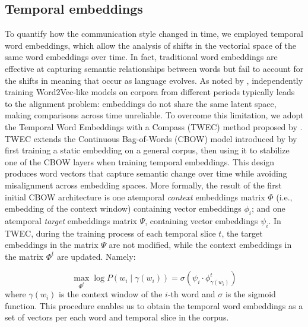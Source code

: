 \subsection{Temporal embeddings}\label{subsec32}
To quantify how the communication style changed in time, we employed temporal word embeddings, which allow the analysis of shifts in the vectorial space of the same word embeddings over time. In fact, traditional word embeddings are effective at capturing semantic relationships between words but fail to account for the shifts in meaning that occur as language evolves. As noted by \cite{Yao2018}, independently training Word2Vec-like models on corpora from different periods typically leads to the alignment problem: embeddings do not share the same latent space, making comparisons across time unreliable. To overcome this limitation, we adopt the Temporal Word Embeddings with a Compass (TWEC) method proposed by \cite{DiCarlo2019}. TWEC extends the Continuous Bag-of-Words (CBOW) model introduced by \cite{Mikolov2013} by first training a static embedding on a general corpus, then using it to stabilize one of the CBOW layers when training temporal embeddings. This design produces word vectors that capture semantic change over time while avoiding misalignment across embedding spaces.
More formally, the result of the first initial CBOW architecture is one atemporal \textit{context} embeddings matrix $\Phi$ (i.e., embedding of the context window) containing vector embeddings $\phi_i$; and one atemporal \textit{target} embeddings matrix $\Psi$, containing vector embeddings $\psi_i$. In TWEC, during the training process of each temporal slice $t$, the target embeddings in the matrix $\Psi$ are not modified, while the context embeddings in the matrix $\Phi^t$ are updated. Namely:

\begin{equation}
    \max_{\Phi^t} \log P(w_i \mid \gamma(w_i)) = \sigma(\psi_i\cdot\phi_{\gamma(w_i)}^t)
\end{equation}
where $\gamma(w_i)$ is the context window of the $i$-th word and $\sigma$ is the sigmoid function. This procedure enables us to obtain the temporal word embeddings as a set of vectors per each word and temporal slice in the corpus.

